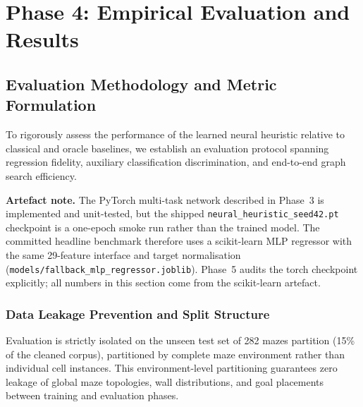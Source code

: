 
\section{Phase 4: Empirical Evaluation and Results}

\subsection{Evaluation Methodology and Metric Formulation}
To rigorously assess the performance of the learned neural heuristic relative to classical
and oracle baselines, we establish an evaluation protocol spanning regression fidelity, auxiliary
classification discrimination, and end-to-end graph search efficiency.

\textbf{Artefact note.} The PyTorch multi-task network described in Phase~3 is implemented and
unit-tested, but the shipped \texttt{neural\_heuristic\_seed42.pt} checkpoint is a one-epoch
smoke run rather than the trained model. The committed headline benchmark therefore uses a
scikit-learn MLP regressor with the same 29-feature interface and target normalisation
(\texttt{models/fallback\_mlp\_regressor.joblib}). Phase~5 audits the torch checkpoint explicitly;
all numbers in this section come from the scikit-learn artefact.

\subsubsection{Data Leakage Prevention and Split Structure}
Evaluation is strictly isolated on the unseen test set of 282 mazes partition (15\% of
the cleaned corpus), partitioned by complete maze environment rather than individual cell
instances. This environment-level partitioning guarantees zero leakage of global maze
topologies, wall distributions, and goal placements between training and evaluation phases.

